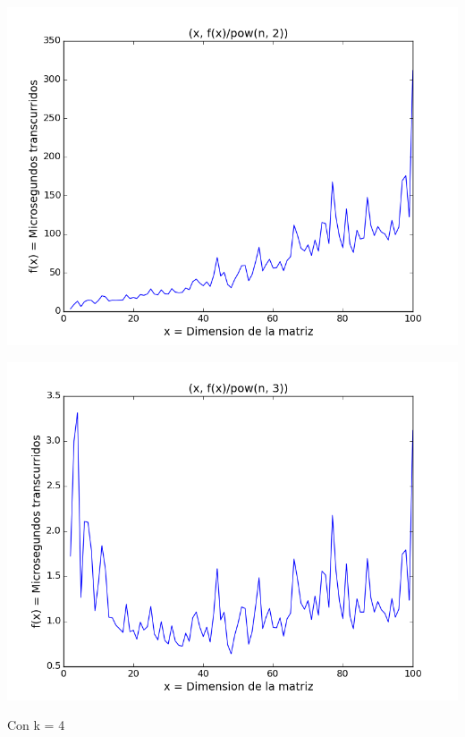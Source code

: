 \begin{center}
\includegraphics[scale=0.54]{images/3potenciasobrecuadrado}
\end{center}


\begin{center}
\includegraphics[scale=0.54]{images/3potenciasobrecubo}
\end{center}


\vspace{2mm}

Con k = 4


